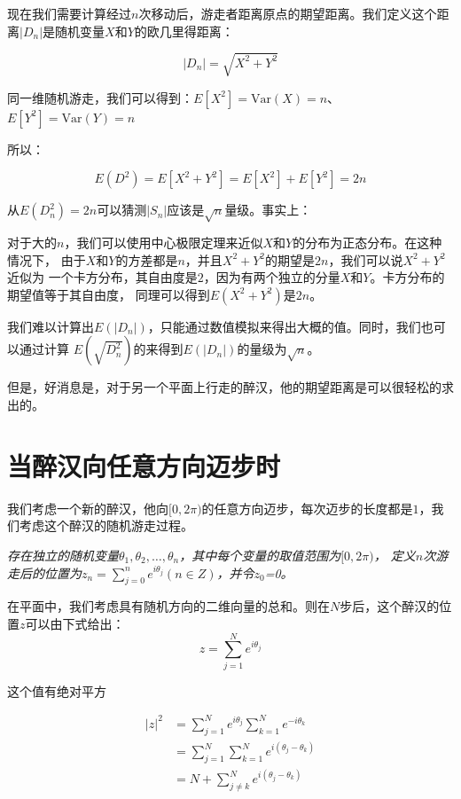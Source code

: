 \documentclass{article}
\begin{document}
现在我们需要计算经过$n$次移动后，游走者距离原点的期望距离。我们定义这个距离$|D_n|$是随机变量$X$和$Y$的欧几里得距离：

$$|D_n|=\sqrt{X^2 + Y^2}$$

同一维随机游走，我们可以得到：$E[X^2]=\text{Var}(X)=n$、$E[Y^2]=\text{Var}(Y)=n$

所以：

$$E(D^2)=E[X^2+Y^2]=E[X^2]+E[Y^2]=2n$$

从$E(D_n^2)=2n$可以猜测$|S_n|$应该是$\sqrt{n}$量级。事实上：

对于大的$n$，我们可以使用中心极限定理来近似$X$和$Y$的分布为正态分布。在这种情况下，
由于$X$和$Y$的方差都是$n$，并且$X^2 + Y^2$的期望是$2n$，我们可以说$X^2 + Y^2$近似为
一个卡方分布，其自由度是$2$，因为有两个独立的分量$X$和$Y$。卡方分布的期望值等于其自由度，
同理可以得到$E(X^2+Y^2)$是$2n$。

我们难以计算出$E(|D_n|)$，只能通过数值模拟来得出大概的值。同时，我们也可以通过计算
$E(\sqrt{D_n^2})$的来得到$E(|D_n|)$的量级为$\sqrt{n}$。

但是，好消息是，对于另一个平面上行走的醉汉，他的期望距离是可以很轻松的求出的。

\section{当醉汉向任意方向迈步时}

我们考虑一个新的醉汉，他向$[0,2\pi)$的任意方向迈步，每次迈步的长度都是$1$，我们考虑这个醉汉的随机游走过程。\cite{RW2D}

\emph{存在独立的随机变量$\theta_1,\theta_2,\dots,\theta_n$，其中每个变量的取值范围为$[0,2\pi)$，
定义$n$次游走后的位置为$z_n=\sum_{j=0}^{n}e^{i\theta_j}(n\in Z)$，并令$z_0$=0。}

在平面中，我们考虑具有随机方向的二维向量的总和。则在$N$步后，这个醉汉的位置$z$可以由下式给出：$$z=\sum_{j=1}^{N}e^{i\theta_j}$$

这个值有绝对平方

\begin{equation*}
    \begin{aligned}
        |z|^2 & =\sum_{j=1}^{N}e^{i\theta_j}\sum_{k=1}^{N}e^{-i\theta_k}\\
              & =\sum_{j=1}^{N}\sum_{k=1}^{N}e^{i(\theta_j-\theta_k)}\\
              & =N+\sum_{j\neq k}^{N}e^{i(\theta_j-\theta_k)}\\
    \end{aligned}
\end{equation*}
\end{document}

